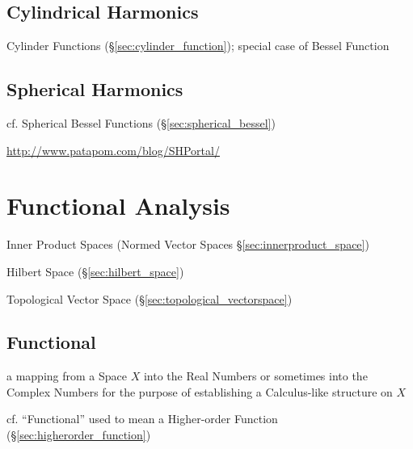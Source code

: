 \subsection{Cylindrical Harmonics}\label{sec:cylindrical_harmonics}

\fist Cylinder Functions (\S\ref{sec:cylinder_function}); special case of Bessel
Function



\subsection{Spherical Harmonics}\label{sec:spherical_harmonics}

\fist cf. Spherical Bessel Functions (\S\ref{sec:spherical_bessel})

\url{http://www.patapom.com/blog/SHPortal/}



\section{Functional Analysis}\label{sec:functional_analysis}

Inner Product Spaces (Normed Vector Spaces
\S\ref{sec:innerproduct_space})

Hilbert Space (\S\ref{sec:hilbert_space})

Topological Vector Space (\S\ref{sec:topological_vectorspace})



\subsection{Functional}\label{sec:functional}

a mapping from a Space $X$ into the Real Numbers or sometimes into the Complex
Numbers for the purpose of establishing a Calculus-like structure on $X$

\fist cf. ``Functional'' used to mean a Higher-order Function
(\S\ref{sec:higherorder_function})


